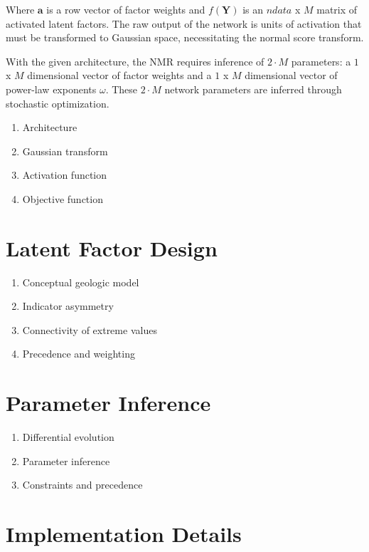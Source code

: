 Where $\mathbf{a}$ is a row vector of factor weights and $f\left(\mathbf{Y} \right)$ is an $ndata$ x $M$ matrix of activated latent factors. The raw output of the network is units of activation that must be transformed to Gaussian space, necessitating the normal score transform.


With the given architecture, the \gls{NMR} requires inference of $2 \cdot M$ parameters: a $1$ x $M$ dimensional vector of factor weights and a $1$ x $M$ dimensional vector of power-law exponents $\omega$. These $2 \cdot M$ network parameters are inferred through stochastic optimization.

\begin{enumerate}[noitemsep]
    \item Architecture
    \item Gaussian transform
    \item Activation function
    \item Objective function
\end{enumerate}


\FloatBarrier
\section{Latent Factor Design}
\label{sec:factord}

\begin{enumerate}[noitemsep]
    \item Conceptual geologic model
    \item Indicator asymmetry
    \item Connectivity of extreme values
    \item Precedence and weighting
\end{enumerate}


\FloatBarrier
\section{Parameter Inference}
\label{sec:paraminfer}

\begin{enumerate}[noitemsep]
    \item Differential evolution
    \item Parameter inference
    \item Constraints and precedence

\end{enumerate}


\FloatBarrier
\section{Implementation Details}
\label{sec:implementd}

